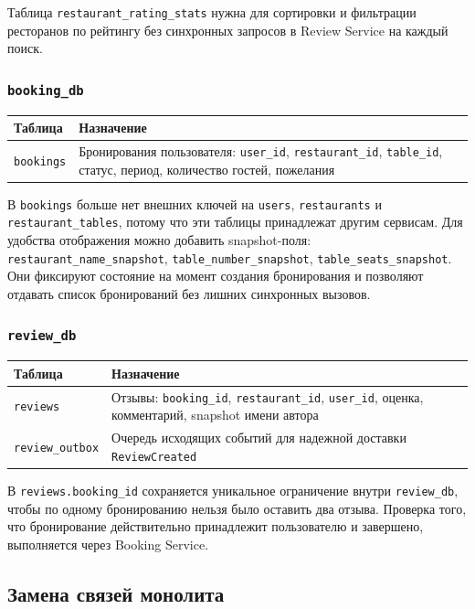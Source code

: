 \documentclass[14pt,a4paper]{extarticle}
\newcommand{\code}[1]{\texttt{#1}}
\begin{document}
Таблица \code{restaurant\_rating\_stats} нужна для сортировки и фильтрации ресторанов по рейтингу без синхронных запросов в Review Service на каждый поиск.

\subsubsection{\code{booking\_db}}

\begin{longtable}{|L{0.28\textwidth}|L{0.62\textwidth}|}
\hline
\textbf{Таблица} & \textbf{Назначение} \\
\hline
\code{bookings} & Бронирования пользователя: \code{user\_id}, \code{restaurant\_id}, \code{table\_id}, статус, период, количество гостей, пожелания \\
\hline
\end{longtable}

В \code{bookings} больше нет внешних ключей на \code{users}, \code{restaurants} и \code{restaurant\_tables}, потому что эти таблицы принадлежат другим сервисам. Для удобства отображения можно добавить snapshot-поля: \code{restaurant\_name\_snapshot}, \code{table\_number\_snapshot}, \code{table\_seats\_snapshot}. Они фиксируют состояние на момент создания бронирования и позволяют отдавать список бронирований без лишних синхронных вызовов.

\subsubsection{\code{review\_db}}

\begin{longtable}{|L{0.28\textwidth}|L{0.62\textwidth}|}
\hline
\textbf{Таблица} & \textbf{Назначение} \\
\hline
\code{reviews} & Отзывы: \code{booking\_id}, \code{restaurant\_id}, \code{user\_id}, оценка, комментарий, snapshot имени автора \\
\hline
\code{review\_outbox} & Очередь исходящих событий для надежной доставки \code{ReviewCreated} \\
\hline
\end{longtable}

В \code{reviews.booking\_id} сохраняется уникальное ограничение внутри \code{review\_db}, чтобы по одному бронированию нельзя было оставить два отзыва. Проверка того, что бронирование действительно принадлежит пользователю и завершено, выполняется через Booking Service.

\subsection{Замена связей монолита}
\end{document}
